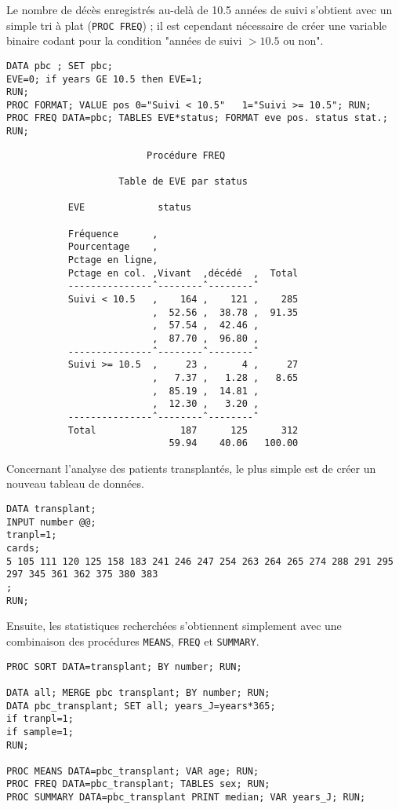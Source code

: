 Le nombre de décès enregistrés au-delà de 10.5 années de suivi s'obtient
avec un simple tri à plat (\texttt{PROC FREQ}) ; il est cependant nécessaire
de créer une variable binaire codant pour la condition "années de suivi
$>10.5$ ou non".
\begin{verbatim}
DATA pbc ; SET pbc;
EVE=0; if years GE 10.5 then EVE=1;
RUN;
PROC FORMAT; VALUE pos 0="Suivi < 10.5"   1="Suivi >= 10.5"; RUN;
PROC FREQ DATA=pbc; TABLES EVE*status; FORMAT eve pos. status stat.; RUN;
\end{verbatim}

\begin{verbatim}
                         Procédure FREQ

                    Table de EVE par status

           EVE             status

           Fréquence      ‚
           Pourcentage    ‚
           Pctage en ligne‚
           Pctage en col. ‚Vivant  ‚décédé  ‚  Total
           ---------------ˆ--------ˆ--------ˆ
           Suivi < 10.5   ‚    164 ‚    121 ‚    285
                          ‚  52.56 ‚  38.78 ‚  91.35
                          ‚  57.54 ‚  42.46 ‚
                          ‚  87.70 ‚  96.80 ‚
           ---------------ˆ--------ˆ--------ˆ
           Suivi >= 10.5  ‚     23 ‚      4 ‚     27
                          ‚   7.37 ‚   1.28 ‚   8.65
                          ‚  85.19 ‚  14.81 ‚
                          ‚  12.30 ‚   3.20 ‚
           ---------------ˆ--------ˆ--------ˆ
           Total               187      125      312
                             59.94    40.06   100.00
\end{verbatim}

Concernant l'analyse des patients transplantés, le plus simple est de créer
un nouveau tableau de données.
\begin{verbatim}
DATA transplant;
INPUT number @@;
tranpl=1;
cards;
5 105 111 120 125 158 183 241 246 247 254 263 264 265 274 288 291 295 297 345 361 362 375 380 383
;
RUN;
\end{verbatim}
Ensuite, les statistiques recherchées s'obtiennent simplement avec une
combinaison des procédures \texttt{MEANS}, \texttt{FREQ} et
\texttt{SUMMARY}.
\begin{verbatim}
PROC SORT DATA=transplant; BY number; RUN;

DATA all; MERGE pbc transplant; BY number; RUN;
DATA pbc_transplant; SET all; years_J=years*365;
if tranpl=1;
if sample=1;
RUN;

PROC MEANS DATA=pbc_transplant; VAR age; RUN;
PROC FREQ DATA=pbc_transplant; TABLES sex; RUN;
PROC SUMMARY DATA=pbc_transplant PRINT median; VAR years_J; RUN;
\end{verbatim}


